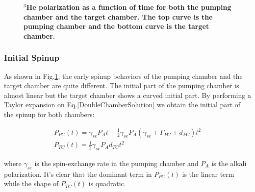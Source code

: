 \begin{figure}[H]
	\centering
	\caption{{\bf $^{3}$He polarization as a function of time for both the pumping chamber and the target chamber. The top curve is the pumping chamber and the bottom curve is the target chamber.}}
	\label{BradySpinup}
\end{figure}

\subsubsection{Initial Spinup}

As shown in Fig.\ref{BradySpinup}, the early spinup behaviors of the pumping chamber and the target chamber are quite different. The initial part of the pumping chamber is almost linear but the target chamber shows a curved initial part. By performing a Taylor expansion on Eq.\ref{DoubleChamberSolution} we obtain the initial part of the spinup for both chambers:

\begin{subequations}\label{InitialSpinup}
	\begin{gather}
	P_{PC}(t)=\gamma_{se}P_{A}t-\frac{1}{2}\gamma_{se}P_{A}(\gamma_{se}+\Gamma_{PC}+d_{PC})t^{2}\\
	P_{TC}(t)=\frac{1}{2}\gamma_{se}P_{A}d_{TC}t^{2}
	\end{gather}
\end{subequations}

where $\gamma_{se}$ is the spin-exchange rate in the pumping chamber and $P_{A}$ is the alkali polarization. It's clear that the dominant term in $P_{PC}(t)$ is the linear term while the shape of $P_{TC}(t)$ is quadratic. 

